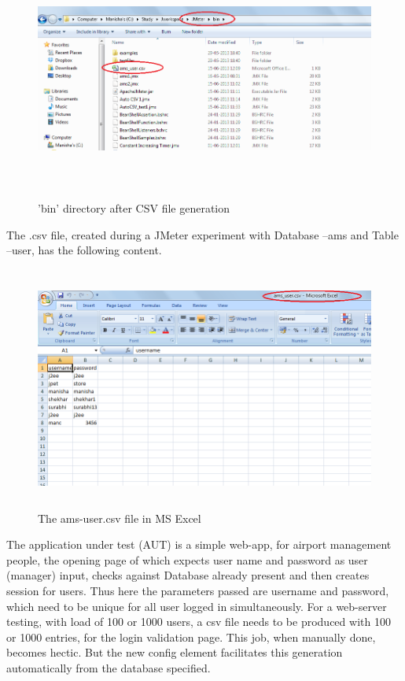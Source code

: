 \documentclass[12pt]{book}
\begin{document}
  \begin{figure}[H]
   \centering
   \includegraphics[width=15cm, height=8cm]{images/autocsvgeneration_82}
   \caption{'bin' directory after CSV file generation\label{fig:fig22_JMeter}}
  \end{figure}
  
  The .csv file, created during a JMeter experiment with Database –ams and Table –user, has the
  following content.
  
  \begin{figure}[H]
   \centering
   \includegraphics[width=15cm, height=8cm]{images/autocsvgeneration_83}
   \caption{The ams-user.csv file in MS Excel\label{fig:fig23_JMeter}}
  \end{figure}  
  
  The application under test (AUT) is a simple web-app, for airport management people, the
  opening page of which expects user name and password as user (manager) input, checks against
  Database already present and then creates session for users. Thus here the parameters passed are
  username and password, which need to be unique for all user logged in simultaneously. For a
  web-server testing, with load of 100 or 1000 users, a csv file needs to be produced with 100 or
  1000 entries, for the login validation page. This job, when manually done, becomes hectic. But
  the new config element facilitates this generation automatically from the database specified.\\
  
\end{document}
